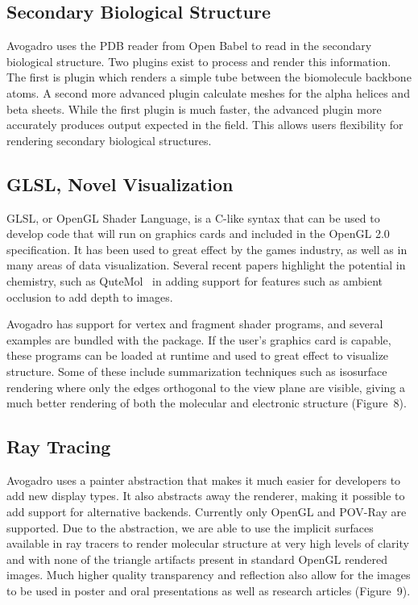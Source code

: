 \documentclass[10pt]{bmc_article}
\newenvironment{bmcformat}{\begin{raggedright}
  \baselineskip20pt\sloppy\setboolean{publ}{false}}{\end{raggedright}
  \baselineskip20pt\sloppy}
\begin{document}
\begin{bmcformat}
\subsection*{Secondary Biological Structure}

Avogadro uses the PDB reader from Open Babel to read in the secondary
biological structure. Two plugins exist to process and render this information.
The first is plugin which renders a simple tube between the biomolecule
backbone atoms. A second more advanced plugin calculate meshes for
the alpha helices and beta sheets. While the first plugin is much
faster, the advanced plugin more accurately produces output expected
in the field.  This allows users flexibility for rendering
secondary biological structures.

\subsection*{GLSL, Novel Visualization}

GLSL, or OpenGL Shader Language, is a C-like syntax that can be used to develop
code that will run on graphics cards and included in the OpenGL 2.0
specification. It has been used to great effect by the games industry,
as well as in many areas of data visualization. Several recent papers
highlight the potential in chemistry, such as QuteMol~\cite{QuteMol}
in adding support for features such as ambient occlusion to add depth to images.

Avogadro has support for vertex and fragment shader programs, and several
examples are bundled with the package. If the user's graphics card is capable,
these programs can be loaded at runtime and used to great effect to visualize
structure. Some of these include summarization techniques such as isosurface
rendering where only the edges orthogonal to the view plane are visible, giving
a much better rendering of both the molecular and electronic structure (Figure~8).

\subsection*{Ray Tracing}

Avogadro uses a painter abstraction that makes it much easier for developers to
add new display types. It also abstracts away the renderer, making it possible
to add support for alternative backends. Currently only OpenGL and POV-Ray are
supported. Due to the abstraction, we are able to use the implicit surfaces
available in ray tracers to render molecular structure at very high levels of
clarity and with none of the triangle artifacts present in standard OpenGL rendered
images. Much higher quality transparency and reflection also allow for the
images to be used in poster and oral presentations as well as research
articles (Figure~9).


\end{bmcformat}
\end{document}
